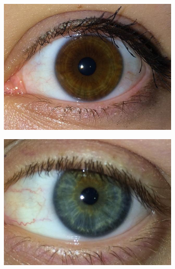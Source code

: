 \begin{figure}[H]
    \centering %
\begin{subfigure}{0.25\textwidth}
  \includegraphics[width=\linewidth]{img/Resultados/warsaw/left_1.jpg}
  \caption{}
\end{subfigure}\hfil %
\begin{subfigure}{0.25\textwidth}
  \includegraphics[width=\linewidth]{img/Resultados/warsaw/left_17.jpg}
  \caption{}
\end{subfigure}\hfil %
\begin{subfigure}{0.25\textwidth}

\end{subfigure}
\end{figure}

